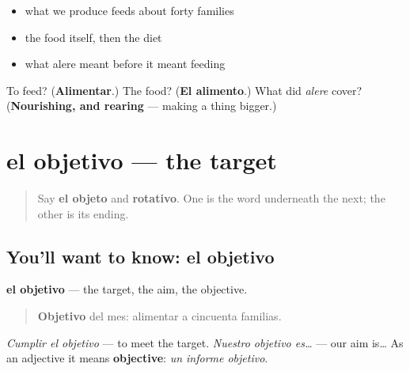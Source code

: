 \begin{itemize}
\raggedright
  \item what we produce feeds about forty families
  \item the food itself, then the diet
  \item what alere meant before it meant feeding
\end{itemize}

\begin{tcolorbox}[breakable,colback=teal!4,colframe=teal!35!black,title={Before you move on}]
To feed? (\textbf{Alimentar}.) The food? (\textbf{El alimento}.) What did \emph{alere} cover? (\textbf{Nourishing, and rearing} — making a thing bigger.)
\end{tcolorbox}
\section[el objetivo]{el objetivo — the target}

\label{lesson:ES-C467-objetivo}



\begin{quote}
Say \textbf{el objeto} and \textbf{rotativo}. One is the word underneath the next; the other is its ending.
\end{quote}

\subsection*{You'll want to know: el objetivo}
\textbf{el objetivo} — the target, the aim, the objective.

\begin{quote}
\textbf{Objetivo} del mes: alimentar a cincuenta familias.
\end{quote}

\emph{Cumplir el objetivo} — to meet the target. \emph{Nuestro objetivo es…} — our aim is… As an adjective it means \textbf{objective}: \emph{un informe objetivo}.

